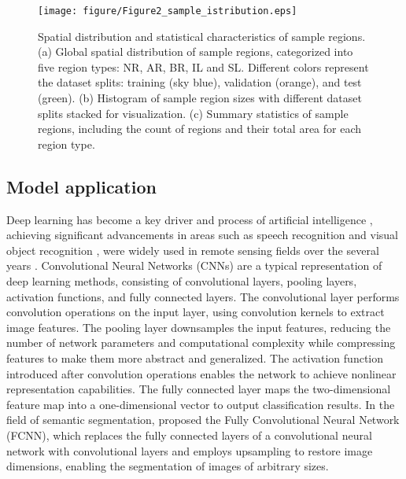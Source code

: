 \documentclass[preprint,12pt,authoryear]{elsarticle}
\begin{document}
\begin{figure}[h]
    \centering
    \texttt{[image: figure/Figure2\_sample\_istribution.eps]}
    \caption{Spatial distribution and statistical characteristics of sample regions. (a) Global spatial distribution of sample regions, categorized into five region types: NR, AR, BR, IL and SL. Different colors represent the dataset splits: training (sky blue), validation (orange), and test (green). (b) Histogram of sample region sizes with different dataset splits stacked for visualization. (c) Summary statistics of sample regions, including the count of regions and their total area for each region type.}
    \label{fig:Fig2}
\end{figure}

\subsection{Model application}
\label{subsec3}

Deep learning has become a key driver and process of artificial intelligence \citep{brandt_unexpectedly_2020}, achieving significant advancements in areas such as speech recognition and visual object recognition \citep{zhu_deep_2017}, were widely used in remote sensing fields over the several years \citep{zhu_deep_2017}. Convolutional Neural Networks (CNNs) are a typical representation of deep learning methods, consisting of convolutional layers, pooling layers, activation functions, and fully connected layers. The convolutional layer performs convolution operations on the input layer, using convolution kernels to extract image features. The pooling layer downsamples the input features, reducing the number of network parameters and computational complexity while compressing features to make them more abstract and generalized. The activation function introduced after convolution operations enables the network to achieve nonlinear representation capabilities. The fully connected layer maps the two-dimensional feature map into a one-dimensional vector to output classification results. In the field of semantic segmentation, \citet{shelhamer_fully_2017} proposed the Fully Convolutional Neural Network (FCNN), which replaces the fully connected layers of a convolutional neural network with convolutional layers and employs upsampling to restore image dimensions, enabling the segmentation of images of arbitrary sizes.
\end{document}
